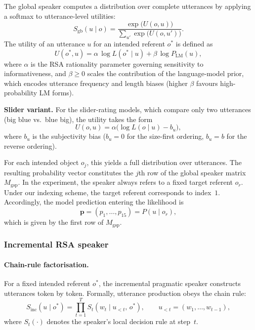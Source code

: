 \documentclass[11pt, a4paper]{article}
\newcommand{\utter}[1]{\textsf{#1}} %
\begin{document}
The global speaker computes a distribution over complete utterances by applying a softmax to utterance-level utilities:
\begin{equation}
  S_{\text{gb}}(u \mid o)
  = \frac{\exp\!\bigl(U(o,u)\bigr)}{\sum_{u'} \exp\!\bigl(U(o,u')\bigr)}.
  \label{eq:global_speaker}
\end{equation}
The utility of an utterance $u$ for an intended referent $o^\ast$ is defined as
\begin{equation}
  U(o^\ast,u)
  = \alpha\,\log L(o^\ast \mid u) + \beta\,\log P_{\mathrm{LM}}(u),
  \label{eq:global_utility}
\end{equation}
where $\alpha$ is the RSA rationality parameter governing sensitivity to informativeness, and $\beta \geq 0$ scales the contribution of the language-model prior, which encodes utterance frequency and length biases (higher $\beta$ favours high-probability LM forms).

\textbf{Slider variant.}
For the slider-rating models, which compare only two utterances (\utter{big blue} vs.\ \utter{blue big}), the utility takes the form
\begin{equation}
  U(o,u) = \alpha\bigl(\log L(o \mid u) - b_u\bigr),
  \label{eq:slider_utility}
\end{equation}
where $b_u$ is the subjectivity bias ($b_u = 0$ for the size-first ordering, $b_u = b$ for the reverse ordering).

For each intended object $o_j$, this yields a full distribution over utterances.
The resulting probability vector constitutes the $j$th row of the global speaker matrix $M_{\text{gsp}}$.
In the experiment, the speaker always refers to a fixed target referent $o_r$.
Under our indexing scheme, the target referent corresponds to index~$1$.
Accordingly, the model prediction entering the likelihood is
\begin{equation}
  \mathbf{p} = (p_1,\dots,p_{15}) = P(u \mid o_r),
  \label{eq:global_prediction}
\end{equation}
which is given by the first row of $M_{\text{gsp}}$.

\subsubsection{Incremental RSA speaker}
\label{sec:model:speakers:incremental}

\paragraph{Chain-rule factorisation.}
For a fixed intended referent $o^\ast$, the incremental pragmatic speaker constructs utterances token by token.
Formally, utterance production obeys the chain rule:
\begin{equation}
  S_{\mathrm{inc}}(u \mid o^\ast)
  = \prod_{t=1}^{T} S_t\!\left(w_t \mid u_{<t},\, o^\ast\right),
  \qquad u_{<t} = (w_1,\ldots,w_{t-1}),
  \label{eq:inc_chain}
\end{equation}
where $S_t(\cdot)$ denotes the speaker's local decision rule at step~$t$.
\end{document}
